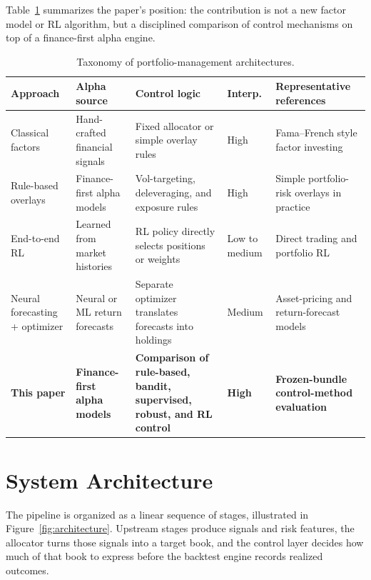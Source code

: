 \documentclass[10pt,twocolumn]{article}
\begin{document}
Table~\ref{tab:taxonomy} summarizes the paper's position: the contribution is
not a new factor model or RL algorithm, but a disciplined comparison of control
mechanisms on top of a finance-first alpha engine.

\begin{table}[t]
\centering
\scriptsize
\caption{Taxonomy of portfolio-management architectures.}
\label{tab:taxonomy}
\begin{tabular}{@{} >{\raggedright\arraybackslash}p{2.1cm}
                >{\raggedright\arraybackslash}p{2.1cm}
                >{\raggedright\arraybackslash}p{2.15cm}
                >{\raggedright\arraybackslash}p{1.45cm}
                >{\raggedright\arraybackslash}p{4.2cm} @{}}
\toprule
\textbf{Approach} & \textbf{Alpha source} & \textbf{Control logic} & \textbf{Interp.} & \textbf{Representative references} \\
\midrule
Classical factors & Hand-crafted financial signals & Fixed allocator or simple overlay rules & High & Fama--French style factor investing \cite{fama1993} \\
Rule-based overlays & Finance-first alpha models & Vol-targeting, deleveraging, and exposure rules & High & Simple portfolio-risk overlays in practice \cite{almgren2000} \\
End-to-end RL & Learned from market histories & RL policy directly selects positions or weights & Low to medium & Direct trading and portfolio RL \cite{moody2001,jiang2017,zhang2020,cong2021} \\
Neural forecasting + optimizer & Neural or ML return forecasts & Separate optimizer translates forecasts into holdings & Medium & Asset-pricing and return-forecast models \cite{gu2020,chen2021,giglio2022} \\
\textbf{This paper} & \textbf{Finance-first alpha models} & \textbf{Comparison of rule-based, bandit, supervised, robust, and RL control} & \textbf{High} & \textbf{Frozen-bundle control-method evaluation} \\
\bottomrule
\end{tabular}
\end{table}

\section{System Architecture}

The pipeline is organized as a linear sequence of stages, illustrated in
Figure~\ref{fig:architecture}. Upstream stages produce signals and risk
features, the allocator turns those signals into a target book, and the control
layer decides how much of that book to express before the backtest engine
records realized outcomes.
\end{document}
